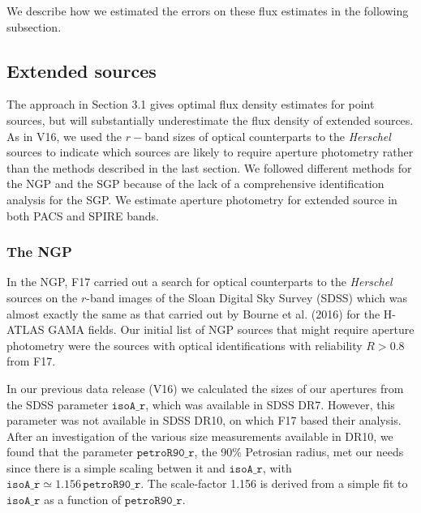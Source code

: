 \documentclass[a4paper,fleqn,usenatbib, twocolumn]{aastex61}
\begin{document}
We describe how we estimated the errors on these flux estimates in the
following subsection.

\subsection{Extended sources} 

The approach in Section 3.1 gives optimal flux density estimates for
point sources, but will substantially underestimate the flux density
of extended sources.  As in V16, we used the $r-$band sizes of optical
counterparts to the {\it Herschel} sources to indicate which sources
are likely to require aperture photometry rather than the methods
described in the last section.  We followed different methods for the
NGP and the SGP because of the lack of a comprehensive identification
analysis for the SGP. We estimate aperture photometry for extended
source in both PACS and SPIRE bands.

\subsubsection{The NGP}

In the NGP, F17 carried out a search for optical counterparts to the
{\it Herschel} sources on the $r$-band images of the Sloan Digital Sky
Survey (SDSS) which was almost exactly the same as that carried out by
Bourne et al. (2016) for the H-ATLAS GAMA fields.  Our initial list of
NGP sources that might require aperture photometry were the sources
with optical identifications with reliability $R>0.8$ from F17.

In our previous data release (V16) we calculated the sizes of our
apertures from the SDSS parameter $\mathtt{isoA\_r}$, which was
available in SDSS DR7. However, this parameter was not available in
SDSS DR10, on which F17 based their analysis.  After an investigation
of the various size measurements available in DR10, we found that the
parameter $\mathtt{petroR90\_r}$, the 90\% Petrosian radius, met our
needs since there is a simple scaling betwen it and
$\mathtt{isoA\_r}$, with
$\mathtt{isoA\_r} \simeq 1.156 \, \mathtt{petroR90\_r}$.
The scale-factor 1.156 is derived from a simple fit to
$\mathtt{isoA\_r}$ as a function of $\mathtt{petroR90\_r}$.
\end{document}
